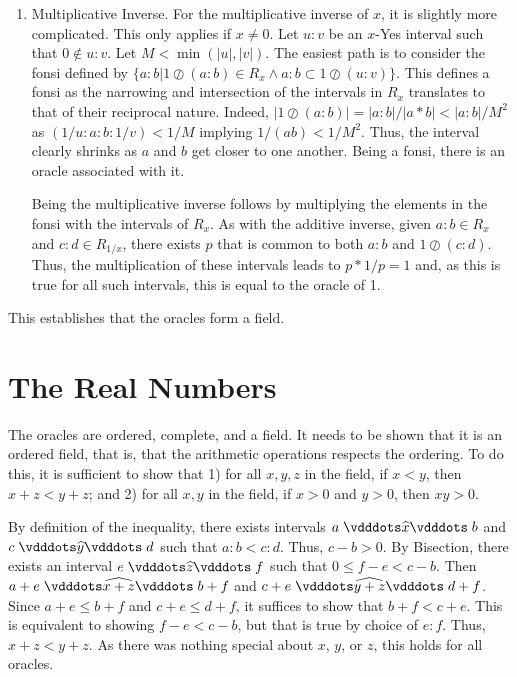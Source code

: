 \documentclass[12pt]{article}
\begin{document}
\begin{enumerate}
    \item Multiplicative Inverse. For the multiplicative inverse of $x$, it is slightly more complicated. This only applies if $x \neq 0$. Let $u:v$ be an $x$-Yes interval such that $0 \notin u:v$. Let $M < \min(|u|, |v|)$. 
    The easiest path is to consider the fonsi defined by $\{ a:b | 1 \oslash (a:b) \in R_x \wedge a:b \subset 1 \oslash (u:v) \}$. This defines a fonsi as the narrowing and intersection of the intervals in $R_x$ translates to that of their reciprocal nature. Indeed, $|1 \oslash (a:b)| = |a:b|/|a*b| < |a:b|/M^2$ as $(1/u : a : b: 1/v) < 1/M$ implying $1/(ab)< 1/M^2$. Thus, the interval clearly shrinks as $a$ and $b$ get closer to one another. Being a fonsi, there is an oracle associated with it. 

    Being the multiplicative inverse follows by multiplying the elements in the fonsi with the intervals of $R_x$. As with the additive inverse, given $a:b \in R_x$ and $c:d \in R_{1/x}$, there exists $p$ that is common to both $a:b$ and $1 \oslash (c:d)$. Thus, the multiplication of these intervals leads to $p *1/p = 1$ and, as this is true for all such intervals, this is equal to the oracle of 1. 

\end{enumerate}

This establishes that the oracles form a field. 


\section{The Real Numbers}

The oracles are ordered, complete, and a field. It needs to be shown that it is an ordered field, that is, that the arithmetic operations respects the ordering. To do this, it is sufficient to show that 1) for all $x, y, z$ in the field, if $x<y$, then $x + z < y +z$; and 2) for all $x, y$ in the field, if $x >0$ and $y>0$, then $xy > 0 $.

By definition of the inequality, there exists intervals $ a \xora[x] b$ and $c \xora[y] d$ such that $a:b < c:d$. Thus, $c-b > 0$. By Bisection, there exists an interval $e \xora[z] f$ such that $0 \leq f-e < c-b$. Then $a+e \xora[x+z] b+f$ and $c+e \xora[y+z] d+f$. Since $a+e \leq  b+f$ and $c+e \leq d+f$, it suffices to show that $b+f < c+e$. This is equivalent to showing $f-e < c-b$, but that is true by choice of $e:f$. Thus, $x+z < y+z$. As there was nothing special about $x$, $y$, or $z$, this holds for all oracles. 
\end{document}
